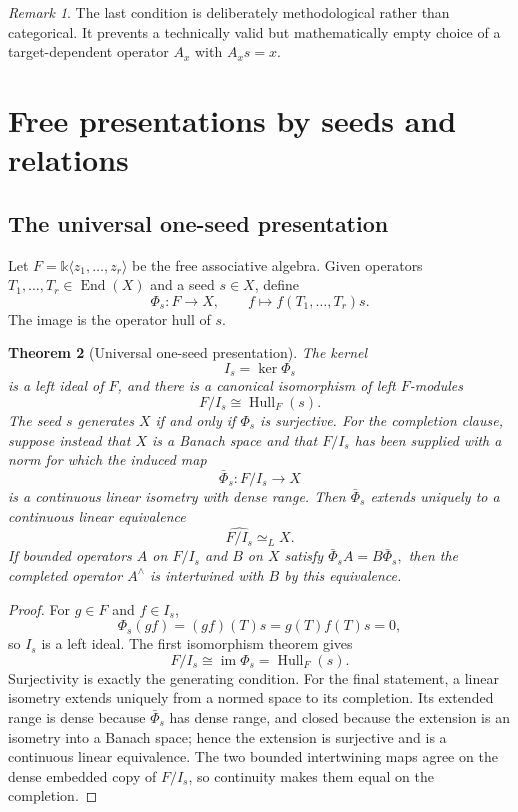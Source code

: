 \documentclass[11pt]{article}
\newtheorem{theorem}{Theorem}[section]
\theoremstyle{definition}
\theoremstyle{remark}
\newtheorem{remark}[theorem]{Remark}
\newcommand{\Hull}{\operatorname{Hull}}
\newcommand{\End}{\operatorname{End}}
\newcommand{\im}{\operatorname{im}}
\newcommand{\bbk}{\mathbb{k}}
\begin{document}
\begin{remark}
The last condition is deliberately methodological rather than categorical. It prevents a technically valid but mathematically empty choice of a target-dependent operator $A_x$ with $A_xs=x$.
\end{remark}

\section{Free presentations by seeds and relations}

\subsection{The universal one-seed presentation}

Let $F=\bbk\langle z_1,\ldots,z_r\rangle$ be the free associative algebra. Given operators $T_1,\ldots,T_r\in\End(X)$ and a seed $s\in X$, define
\[
\Phi_s:F\longrightarrow X,
\qquad
f\longmapsto f(T_1,\ldots,T_r)s.
\]
The image is the operator hull of $s$.

\begin{theorem}[Universal one-seed presentation]
\label{thm:one-seed-presentation}
The kernel
\[
I_s=\ker\Phi_s
\]
is a left ideal of $F$, and there is a canonical isomorphism of left $F$-modules
\[
\boxed{
F/I_s\cong\Hull_F(s).
}
\]
The seed $s$ generates $X$ if and only if $\Phi_s$ is surjective. For the completion clause, suppose instead that $X$ is a Banach space and that $F/I_s$ has been supplied with a norm for which the induced map
\[
\bar\Phi_s:F/I_s\longrightarrow X
\]
is a continuous linear isometry with dense range. Then $\bar\Phi_s$ extends uniquely to a continuous linear equivalence
\[
\boxed{\widehat{F/I_s}\simeq_L X.}
\]
If bounded operators $A$ on $F/I_s$ and $B$ on $X$ satisfy
\(
\bar\Phi_sA=B\bar\Phi_s,
\)
then the completed operator $A^\wedge$ is intertwined with $B$ by this equivalence.
\end{theorem}

\begin{proof}
For $g\in F$ and $f\in I_s$,
\[
\Phi_s(gf)=(gf)(T)s=g(T)f(T)s=0,
\]
so $I_s$ is a left ideal. The first isomorphism theorem gives
\[
F/I_s\cong\im\Phi_s=\Hull_F(s).
\]
Surjectivity is exactly the generating condition. For the final statement, a linear isometry extends uniquely from a normed space to its completion. Its extended range is dense because $\bar\Phi_s$ has dense range, and closed because the extension is an isometry into a Banach space; hence the extension is surjective and is a continuous linear equivalence. The two bounded intertwining maps agree on the dense embedded copy of $F/I_s$, so continuity makes them equal on the completion.
\end{proof}
\end{document}
